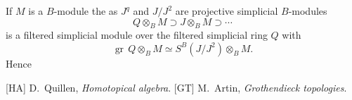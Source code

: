 \documentclass[10pt,reqno]{amsart}
\DeclareMathOperator{\gr}{gr\,}
\begin{document}
If $M$ is a $B$-module the as $J^q$ and $J/J^2$ are projective simplicial $B$-modules
\[
  Q\otimes_B M\supset J\otimes_B M\supset\cdots
\]
is a filtered simplicial module over the filtered simplicial ring $Q$ with
\[
  \gr Q\otimes_B M\simeq S^B(J/J^2)\otimes_B M.
\]
Hence

\begin{thebibliography}{7}
[HA] D.~Quillen, \emph{Homotopical algebra}.
[GT] M.~Artin, \emph{Grothendieck topologies}.
\end{thebibliography}
\end{document}
